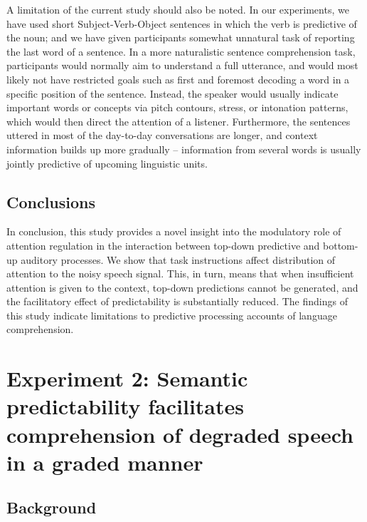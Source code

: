 \documentclass[a4paper, nobind]{templates/ociamthesis}
\begin{document}
A limitation of the current study should also be noted.
In our experiments, we have used short Subject-Verb-Object sentences in which the verb is predictive of the noun; and we have given participants somewhat unnatural task of reporting the last word of a sentence.
In a more naturalistic sentence comprehension task, participants would normally aim to understand a full utterance, and would most likely not have restricted goals such as first and foremost decoding a word in a specific position of the sentence.
Instead, the speaker would usually indicate important words or concepts via pitch contours, stress, or intonation patterns, which would then direct the attention of a listener.
Furthermore, the sentences uttered in most of the day-to-day conversations are longer, and context information builds up more gradually -- information from several words is usually jointly predictive of upcoming linguistic units.

\hypertarget{conclusions}{%
\section{Conclusions}\label{conclusions}}

In conclusion, this study provides a novel insight into the modulatory role of attention regulation in the interaction between top-down predictive and bottom-up auditory processes.
We show that task instructions affect distribution of attention to the noisy speech signal.
This, in turn, means that when insufficient attention is given to the context, top-down predictions cannot be generated, and the facilitatory effect of predictability is substantially reduced.
The findings of this study indicate limitations to predictive processing accounts of language comprehension.

\hypertarget{experiment-2-semantic-predictability-facilitates-comprehension-of-degraded-speech-in-a-graded-manner}{%
\chapter{Experiment 2: Semantic predictability facilitates comprehension of degraded speech in a graded manner}\label{experiment-2-semantic-predictability-facilitates-comprehension-of-degraded-speech-in-a-graded-manner}}

\minitoc

\hypertarget{background}{%
\section{Background}\label{background}}
\end{document}
